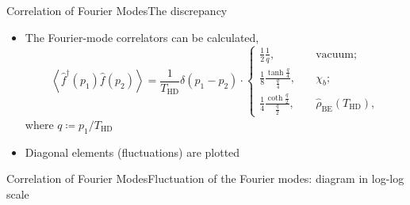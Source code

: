 \documentclass{beamer}
\newcommand{\rbr}[1]{{\left(#1\right)}}
\newcommand{\abr}[1]{{\left<#1\right>}}
\newcommand{\rfun}[2]{{#1}\mathopen{}\left(#2\right)\mathclose{}}
\newcommand{\what}[1]{{\widehat{#1}}}
\begin{document}



\begin{frame}{Correlation of Fourier Modes}{The discrepancy}

\begin{itemize}
\item The Fourier-mode correlators can be calculated,
\begin{equation}
\abr{\rfun{\what{f}^\dagger}{p_1}\rfun{\what{f}}{p_2}} =
\frac{1}{T_\text{HD}} \rfun{\delta}{p_1 - p_2} \cdot
\begin{cases}
\frac{1}{2} \frac{1}{q},
&\quad \text{vacuum};\\
\frac{1}{8}\frac{\tanh\frac{q}{4}}{\frac{q}{4}},
&\quad \chi_b; \\
\frac{1}{4} \frac{\coth\frac{q}{2}}{\frac{q}{2}},
&\quad \rfun{\what{\rho}_\text{BE}}{T_\text{HD}},
\end{cases}
\end{equation}
where $q \coloneqq p_1/T_\text{HD}$
\item Diagonal elements (fluctuations) are plotted
\end{itemize}

\end{frame}

\begin{frame}{Correlation of Fourier Modes}{Fluctuation of the Fourier 
modes: diagram in log-log scale}

\begin{center}

\end{center}

\end{frame}
\end{document}
